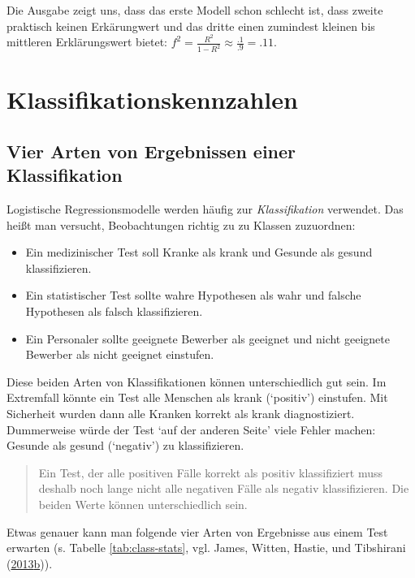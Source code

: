 \documentclass[12pt,ngerman,]{book}
\providecommand{\tightlist}{%
  \setlength{\itemsep}{0pt}\setlength{\parskip}{0pt}}
\theoremstyle{definition}
\theoremstyle{definition}
\theoremstyle{remark}
\begin{document}
Die Ausgabe zeigt uns, dass das erste Modell schon schlecht ist, dass
zweite praktisch keinen Erkärungwert und das dritte einen zumindest
kleinen bis mittleren Erklärungswert bietet:
\(f^2 = \frac{R^2}{1-R^2}\approx \frac{.1}{.9} = .11\).

\section{Klassifikationskennzahlen}\label{klassifikationskennzahlen}

\subsection{Vier Arten von Ergebnissen einer
Klassifikation}\label{vier-arten-von-ergebnissen-einer-klassifikation}

Logistische Regressionsmodelle werden häufig zur
\emph{Klassifikation} verwendet. Das heißt man
versucht, Beobachtungen richtig zu zu Klassen zuzuordnen:

\begin{itemize}
\tightlist
\item
  Ein medizinischer Test soll Kranke als krank und Gesunde als gesund
  klassifizieren.
\item
  Ein statistischer Test sollte wahre Hypothesen als wahr und falsche
  Hypothesen als falsch klassifizieren.
\item
  Ein Personaler sollte geeignete Bewerber als geeignet und nicht
  geeignete Bewerber als nicht geeignet einstufen.
\end{itemize}

Diese beiden Arten von Klassifikationen können unterschiedlich gut sein.
Im Extremfall könnte ein Test alle Menschen als krank (`positiv')
einstufen. Mit Sicherheit wurden dann alle Kranken korrekt als krank
diagnostiziert. Dummerweise würde der Test `auf der anderen Seite' viele
Fehler machen: Gesunde als gesund (`negativ') zu klassifizieren.

\begin{quote}
Ein Test, der alle positiven Fälle korrekt als positiv klassifiziert
muss deshalb noch lange nicht alle negativen Fälle als negativ
klassifizieren. Die beiden Werte können unterschiedlich sein.
\end{quote}

Etwas genauer kann man folgende vier Arten von Ergebnisse aus einem Test
erwarten (s. Tabelle \ref{tab:class-stats}, vgl. James, Witten, Hastie,
und Tibshirani
(\protect\hyperlink{ref-introstatlearning}{2013}\protect\hyperlink{ref-introstatlearning}{b})).
\end{document}
